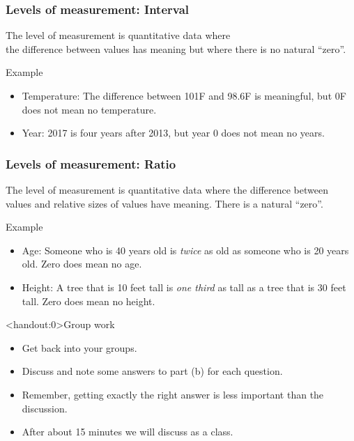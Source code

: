 \documentclass[xcolor=table, handout]{beamer}
\begin{document}
\begin{frame}
\frametitle{Levels of measurement: Interval}
\begin{block}{}
\large The  level of measurement is quantitative data where\\ the difference between values has meaning but where there is no natural ``zero''.
\end{block}
\pause
\begin{exampleblock}{Example}
\begin{itemize}
\item Temperature: The difference between 101\textdegree F and 98.6\textdegree F is meaningful, but 0\textdegree F does not mean no temperature.
\item Year: 2017 is four years after 2013, but year 0 does not mean no years.
\end{itemize}
\end{exampleblock}
\end{frame}

\begin{frame}
\frametitle{Levels of measurement: Ratio}
\begin{block}{}
\large The  level of measurement is quantitative data where the difference between values and relative sizes of values have meaning. There is a natural ``zero''.
\end{block}
\pause
\begin{exampleblock}{Example}
\begin{itemize}
\item Age: Someone who is 40 years old is \emph{twice} as old as someone who is 20 years old. Zero does mean no age.

\item Height: A tree that is 10 feet tall is \emph{one third} as tall as a tree that is 30 feet tall. Zero does mean no height.
\end{itemize}

\end{exampleblock}
\end{frame}

\begin{frame}<handout:0>{Group work}
\begin{block}{}
\large
\begin{itemize}
\item Get back into your groups.
\item Discuss and note some answers to part (b) for each question.
\item Remember, getting exactly the right answer is less important than the discussion.
\item After about 15 minutes we will discuss as a class. 
\end{itemize}
\end{block}
\end{frame}
\end{document}
